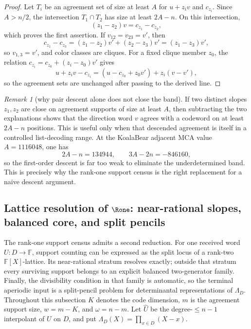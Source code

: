 \documentclass[11pt]{article}
\theoremstyle{definition}
\theoremstyle{remark}
\newtheorem{remark}[remark]{Remark}
\newcommand{\F}{\mathbb{F}}
\begin{document}
\begin{proof}
Let \(T_i\) be an agreement set of size at least \(A\) for \(u+z_iv\) and \(c_{z_i}\).  Since \(A>n/2\), the intersection \(T_1\cap T_2\) has size at least \(2A-n\).  On this intersection,
\[
        (z_1-z_2)v=c_{z_1}-c_{z_2},
\]
which proves the first assertion.  If \(v_{12}=v_{23}=v'\), then
\[
        c_{z_1}-c_{z_3}=(z_1-z_2)v'+(z_2-z_3)v'=(z_1-z_3)v',
\]
so \(v_{1,3}=v'\), and color classes are cliques.  For a fixed clique member \(z_0\), the relation \(c_{z_i}=c_{z_0}+(z_i-z_0)v'\) gives
\[
        u+z_iv-c_{z_i}
        =
        (u-c_{z_0}+z_0v')+z_i(v-v'),
\]
so the agreement sets are unchanged after passing to the derived line.
\end{proof}

\begin{remark}[why pair descent alone does not close the band]\label{rem:capfr1-pair-descent-gap}
If two distinct slopes \(z_1,z_2\) are close on agreement supports of size at least \(A\), then subtracting the two explanations shows that the direction word \(v\) agrees with a codeword on at least \(2A-n\) positions.  This is useful only when that descended agreement is itself in a controlled list-decoding range.  At the KoalaBear adjacent MCA value \(A=1116048\), one has
\[
        2A-n=134944,
        \qquad
        3A-2n=-846160,
\]
so the first-order descent is far too weak to eliminate the underdetermined band.  This is precisely why the rank-one support census is the right replacement for a naive descent argument.
\end{remark}

\subsection{Lattice resolution of \(\Rone\): near-rational slopes, balanced core, and split pencils}\label{subsec:capfr1-lattice-split}

The rank-one support census admits a second reduction.  For one received word \(U:D\to\F\), support counting can be expressed as the split locus of a rank-two \(\F[X]\)-lattice.  Its near-rational stratum resolves exactly; outside that stratum every surviving support belongs to an explicit balanced two-generator family.  Finally, the divisibility condition in that family is automatic, so the terminal aperiodic input is a split-pencil problem for determinantal representations of \(\Lambda_D\).  Throughout this subsection \(K\) denotes the code dimension, \(m\) is the agreement support size, \(w=m-K\), and \(\omega=n-m\).  Let \(\widehat U\) be the degree-\(\le n-1\) interpolant of \(U\) on \(D\), and put \(\Lambda_D(X)=\prod_{x\in D}(X-x)\).
\end{document}
